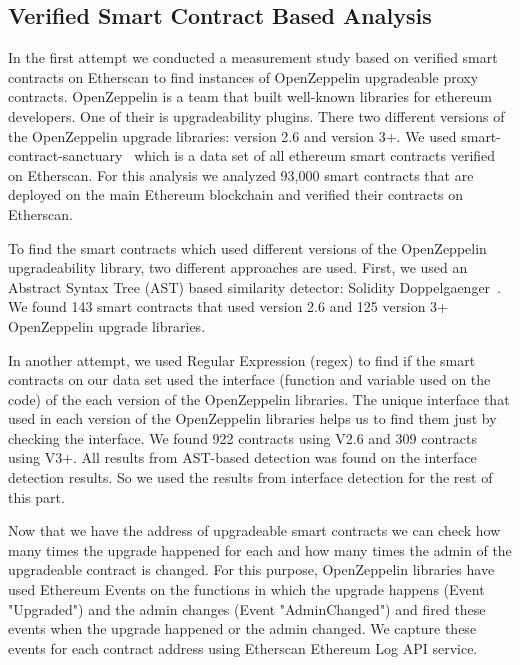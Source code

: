 \subsection{Verified Smart Contract Based Analysis}
In the first attempt we conducted a measurement study based on verified smart contracts on Etherscan to find instances of OpenZeppelin upgradeable proxy contracts. OpenZeppelin is a team that built well-known libraries for ethereum developers. One of their is upgradeability plugins. There two different versions of the OpenZeppelin upgrade libraries: version 2.6 and version 3+. 
We used smart-contract-sanctuary~\cite{smart_contract_sanctuary} which is a data set of all ethereum smart contracts verified on Etherscan. For this analysis we analyzed 93,000 smart contracts that are deployed on the main Ethereum blockchain and verified their contracts on Etherscan. 

To find the smart contracts which used different versions of the OpenZeppelin upgradeability library, two different approaches are used. First, we used an Abstract Syntax Tree (AST) based similarity detector: Solidity Doppelgaenger~\cite{solidity-doppelganger}. We found 143 smart contracts that used version 2.6 and 125 version 3+ OpenZeppelin upgrade libraries. 

In another attempt, we used Regular Expression (regex) to find if the smart contracts on our data set used the interface (function and variable used on the code) of the each version of the OpenZeppelin libraries. The unique interface that used in each version of the OpenZeppelin libraries helps us to find them just by checking the interface. We found 922 contracts using V2.6 and 309 contracts using V3+. All results from AST-based detection was found on the interface detection results. So we used the results from interface detection for the rest of this part.

Now that we have the address of upgradeable smart contracts we can check how many times the upgrade happened for each and how many times the admin of the upgradeable contract is changed. For this purpose, OpenZeppelin libraries have used Ethereum Events on the functions in which the upgrade happens (Event "Upgraded") and the admin changes (Event "AdminChanged") and fired these events when the upgrade happened or the admin changed. We capture these events for each contract address using Etherscan Ethereum Log API service.

